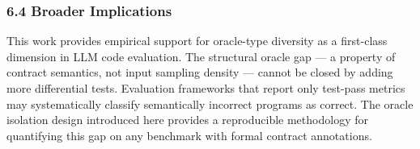 \subsubsection{6.4 Broader Implications}

This work provides empirical support for oracle-type diversity as a first-class dimension in LLM code evaluation. The structural oracle gap --- a property of contract semantics, not input sampling density --- cannot be closed by adding more differential tests. Evaluation frameworks that report only test-pass metrics may systematically classify semantically incorrect programs as correct. The oracle isolation design introduced here provides a reproducible methodology for quantifying this gap on any benchmark with formal contract annotations.

